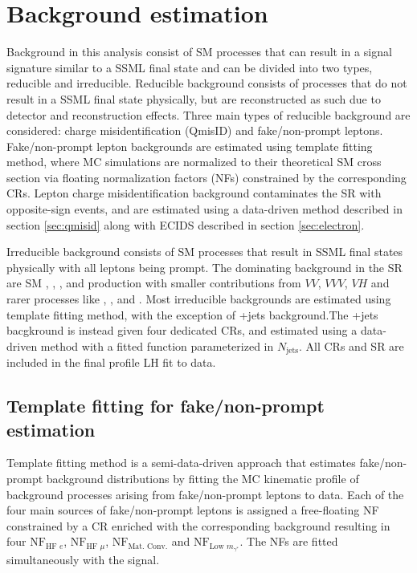 \documentclass[../thesis.tex]{subfiles}
\begin{document}
\section{Background estimation}
\label{sec:bg}
Background in this analysis consist of \acs{SM} processes that can result in a signal signature similar to a \tttt \acs{SSML} final state and can be divided into two types, reducible and irreducible. Reducible background consists of processes that do not result in a \acs{SSML} final state physically, but are reconstructed as such due to detector and reconstruction effects. Three main types of reducible background are considered: charge misidentification (\acs{QmisID}) and fake/non-prompt leptons. Fake/non-prompt lepton backgrounds are estimated using template fitting method, where \acs{MC} simulations are normalized to their theoretical \acs{SM} cross section via floating normalization factors (\acs{NF}s) constrained by the corresponding \acs{CR}s. Lepton charge misidentification background contaminates the \acs{SR} with opposite-sign events, and are estimated using a data-driven method described in section \ref{sec:qmisid} along with \acs{ECIDS} described in section \ref{sec:electron}.

Irreducible background consists of \acs{SM} processes that result in \acs{SSML} final states physically with all leptons being prompt. The dominating background in the \acs{SR} are \acs{SM} \tttt, \ttW, \ttZ, and \ttH production with smaller contributions from $VV$, $VVV$, $VH$ and rarer processes like \ttVV, \tWZ, \tZq and \ttt. Most irreducible backgrounds are estimated using template fitting method, with the exception of \ttW+jets background.The \ttW+jets bacgkround is instead given four dedicated \acs{CR}s, and estimated using a data-driven method with a fitted function parameterized in $N_\mathrm{jets}$. All \acs{CR}s and \acs{SR} are included in the final profile \acs{LH} fit to data.

\subsection{Template fitting for fake/non-prompt estimation}
\label{sec:template}
Template fitting method is a semi-data-driven approach \citep{bg:ttH_ttW_ML} that estimates fake/non-prompt background distributions by fitting the \acs{MC} kinematic profile of background processes arising from fake/non-prompt leptons to data. Each of the four main sources of fake/non-prompt leptons is assigned a free-floating \acs{NF} constrained by a \acs{CR} enriched with the corresponding background resulting in four $\mathrm{NF}_{\text{HF }e}$, $\mathrm{NF}_{\text{HF }\mu}$, $\mathrm{NF}_{\text{Mat. Conv.}}$ and $\mathrm{NF}_{\text{Low }m_{\gamma^{*}}}$. The \acs{NF}s are fitted simultaneously with the signal.
\end{document}
